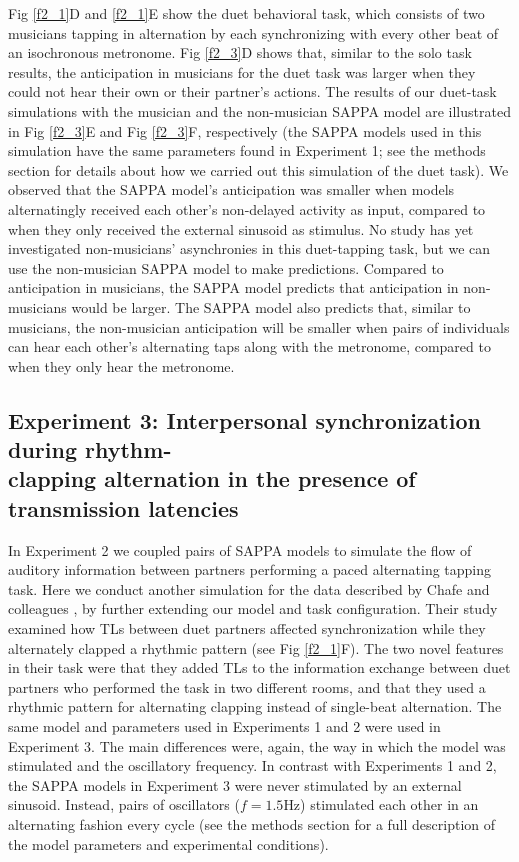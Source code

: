 \documentclass{report}
\begin{document}
Fig \ref{f2_1}D and \ref{f2_1}E show the duet behavioral task, which consists of two musicians tapping in alternation by each synchronizing with every other beat of an isochronous metronome. Fig \ref{f2_3}D shows that, similar to the solo task results, the anticipation in musicians for the duet task was larger when they could not hear their own or their partner's actions. The results of our duet-task simulations with the musician and the non-musician SAPPA model are illustrated in Fig \ref{f2_3}E and Fig \ref{f2_3}F, respectively (the SAPPA models used in this simulation have the same parameters found in Experiment 1; see the methods section for details about how we carried out this simulation of the duet task). We observed that the SAPPA model's anticipation was smaller when models alternatingly received each other's non-delayed activity as input, compared to when they only received the external sinusoid as stimulus. No study has yet investigated non-musicians' asynchronies in this duet-tapping task, but we can use the non-musician SAPPA model to make predictions. Compared to anticipation in musicians, the SAPPA model predicts that anticipation in non-musicians would be larger. The SAPPA model also predicts that, similar to musicians, the non-musician anticipation will be smaller when pairs of individuals can hear each other's alternating taps along with the metronome, compared to when they only hear the metronome.

\subsection{Experiment 3: Interpersonal synchronization during rhythm-\\ clapping alternation in the presence of transmission latencies}

In Experiment 2 we coupled pairs of SAPPA models to simulate the flow of auditory information between partners performing a paced alternating tapping task. Here we conduct another simulation for the data described by Chafe and colleagues \cite{chafe2010effect}, by further extending our model and task configuration. Their study examined how TLs between duet partners affected synchronization while they alternately clapped a rhythmic pattern (see Fig \ref{f2_1}F). The two novel features in their task were that they added TLs to the information exchange between duet partners who performed the task in two different rooms, and that they used a rhythmic pattern for alternating clapping instead of single-beat alternation. The same model and parameters used in Experiments 1 and 2 were used in Experiment 3. The main differences were, again, the way in which the model was stimulated and the oscillatory frequency. In contrast with Experiments 1 and 2, the SAPPA models in Experiment 3 were never stimulated by an external sinusoid. Instead, pairs of oscillators ($f = 1.5$Hz) stimulated each other in an alternating fashion every cycle (see the methods section for a full description of the model parameters and experimental conditions).
\end{document}
